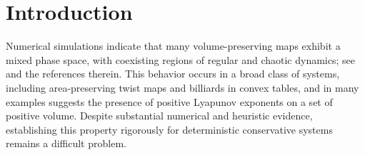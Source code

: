 \documentclass[a4paper,12pt,reqno]{amsart}
\numberwithin{equation}{section}
\begin{document}
\begin{abstract}
We study random dynamical systems generated by measure-preserving maps, possibly with singularities. For this class of systems, we establish an invariance principle: if all Lyapunov exponents coincide almost everywhere, then there exists an invariant measurable family of probability measures on the projective tangent bundle for the projective cocycle induced by the derivative. We apply this principle to random additive perturbations of two classes of maps: billiard maps for strictly convex tables on surfaces of constant curvature and generalized standard maps. In both settings, we obtain rigidity results: the Lyapunov exponents vanish almost everywhere precisely for billiards in geodesic disks and generalized standard maps with constant potential; in all other cases, they are nonzero almost everywhere.


\end{abstract}

\maketitle
\tableofcontents

\section{Introduction}
\label{sec:introduction}
Numerical simulations indicate that many volume-preserving maps exhibit a mixed phase space, with coexisting regions of regular and chaotic dynamics; see~\cite{Strelcyn1991} and the references therein. This behavior occurs in a broad class of systems, including area-preserving twist maps and billiards in convex tables, and in many examples suggests the presence of positive Lyapunov exponents on a set of positive volume. Despite substantial numerical and heuristic evidence, establishing this property rigorously for deterministic conservative systems remains a difficult problem.
\end{document}
